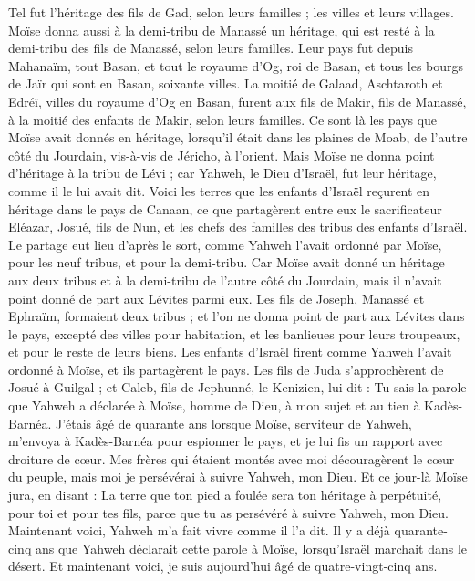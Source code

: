 \begin{multicols}{2}
Tel fut l’héritage des fils de Gad, selon leurs familles ; les villes et leurs villages.
Moïse donna aussi à la demi-tribu de Manassé un héritage, qui est resté à la demi-tribu des fils de Manassé, selon leurs familles.
Leur pays fut depuis Mahanaïm, tout Basan, et tout le royaume d’Og, roi de Basan, et tous les bourgs de Jaïr qui sont en Basan, soixante villes.
La moitié de Galaad, Aschtaroth et Edréï, villes du royaume d’Og en Basan, furent aux fils de Makir, fils de Manassé, à la moitié des enfants de Makir, selon leurs familles.
Ce sont là les pays que Moïse avait donnés en héritage, lorsqu’il était dans les plaines de Moab, de l’autre côté du Jourdain, vis-à-vis de Jéricho, à l’orient.
Mais Moïse ne donna point d’héritage à la tribu de Lévi ; car Yahweh, le Dieu d’Israël, fut leur héritage, comme il le lui avait dit.
\VerseOne{}Voici les terres que les enfants d’Israël reçurent en héritage dans le pays de Canaan, ce que partagèrent entre eux le sacrificateur Eléazar, Josué, fils de Nun, et les chefs des familles des tribus des enfants d’Israël.
Le partage eut lieu d’après le sort, comme Yahweh l’avait ordonné par Moïse, pour les neuf tribus, et pour la demi-tribu.
Car Moïse avait donné un héritage aux deux tribus et à la demi-tribu de l’autre côté du Jourdain, mais il n’avait point donné de part aux Lévites parmi eux.
Les fils de Joseph, Manassé et Ephraïm, formaient deux tribus ; et l’on ne donna point de part aux Lévites dans le pays, excepté des villes pour habitation, et les banlieues pour leurs troupeaux, et pour le reste de leurs biens.
Les enfants d’Israël firent comme Yahweh l’avait ordonné à Moïse, et ils partagèrent le pays.
Les fils de Juda s’approchèrent de Josué à Guilgal ; et Caleb, fils de Jephunné, le Kenizien, lui dit : Tu sais la parole que Yahweh a déclarée à Moïse, homme de Dieu, à mon sujet et au tien à Kadès-Barnéa.
J’étais âgé de quarante ans lorsque Moïse, serviteur de Yahweh, m’envoya à Kadès-Barnéa pour espionner le pays, et je lui fis un rapport avec droiture de cœur.
Mes frères qui étaient montés avec moi découragèrent le cœur du peuple, mais moi je persévérai à suivre Yahweh, mon Dieu.
Et ce jour-là Moïse jura, en disant : La terre que ton pied a foulée sera ton héritage à perpétuité, pour toi et pour tes fils, parce que tu as persévéré à suivre Yahweh, mon Dieu.
Maintenant voici, Yahweh m’a fait vivre comme il l’a dit. Il y a déjà quarante-cinq ans que Yahweh déclarait cette parole à Moïse, lorsqu’Israël marchait dans le désert. Et maintenant voici, je suis aujourd’hui âgé de quatre-vingt-cinq ans.

\end{multicols}
